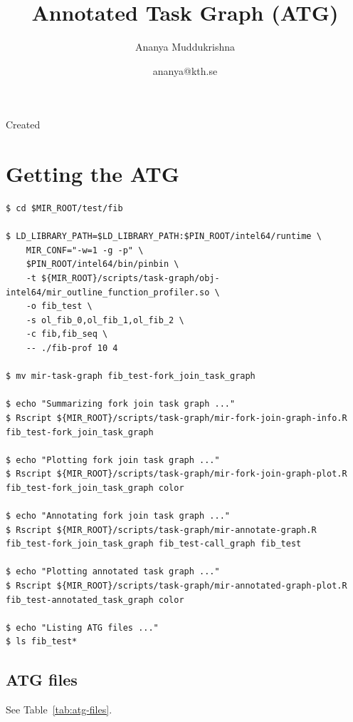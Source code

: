 \documentclass[11pt,a4paper,notitlepage]{article}
\author{Ananya Muddukrishna}
\date{ananya@kth.se}
\title{Annotated Task Graph (ATG)}
\begin{document}
\maketitle

\begin{versionhistory}
 {Created}
\end{versionhistory}

\section{Getting the ATG}

\begin{lstlisting}[style=BashInputStyle]
$ cd $MIR_ROOT/test/fib

$ LD_LIBRARY_PATH=$LD_LIBRARY_PATH:$PIN_ROOT/intel64/runtime \
    MIR_CONF="-w=1 -g -p" \
    $PIN_ROOT/intel64/bin/pinbin \
    -t ${MIR_ROOT}/scripts/task-graph/obj-intel64/mir_outline_function_profiler.so \
    -o fib_test \
    -s ol_fib_0,ol_fib_1,ol_fib_2 \
    -c fib,fib_seq \
    -- ./fib-prof 10 4

$ mv mir-task-graph fib_test-fork_join_task_graph

$ echo "Summarizing fork join task graph ..."
$ Rscript ${MIR_ROOT}/scripts/task-graph/mir-fork-join-graph-info.R fib_test-fork_join_task_graph 

$ echo "Plotting fork join task graph ..."
$ Rscript ${MIR_ROOT}/scripts/task-graph/mir-fork-join-graph-plot.R fib_test-fork_join_task_graph color

$ echo "Annotating fork join task graph ..."
$ Rscript ${MIR_ROOT}/scripts/task-graph/mir-annotate-graph.R fib_test-fork_join_task_graph fib_test-call_graph fib_test

$ echo "Plotting annotated task graph ..."
$ Rscript ${MIR_ROOT}/scripts/task-graph/mir-annotated-graph-plot.R fib_test-annotated_task_graph color

$ echo "Listing ATG files ..."
$ ls fib_test*
\end{lstlisting}

\subsection{ATG files}
See Table~\ref{tab:atg-files}.
\end{document}
